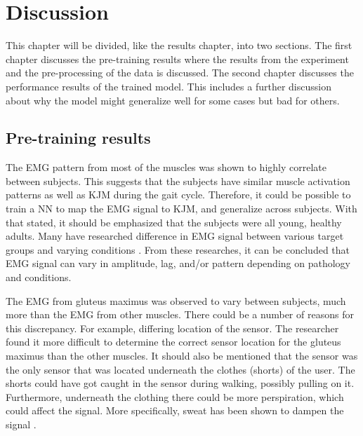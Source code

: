 \documentclass[../main.tex]{subfiles}
\begin{document}
\chapter{Discussion}
\label{sec:discussion}
This chapter will be divided, like the results chapter, into two sections. 
The first chapter discusses the pre-training results where the results from the experiment and the pre-processing of the data is discussed.
The second chapter discusses the performance results of the trained model.
This includes a further discussion about why the model might generalize well for some cases but bad for others.

\section{Pre-training results}
\label{sec:discussion_pre-training-results}
The \ac{EMG} pattern from most of the muscles was shown to highly correlate between subjects.
This suggests that the subjects have similar muscle activation patterns as well as \ac{KJM} during the gait cycle.
Therefore, it could be possible to train a \ac{NN} to map the \ac{EMG} signal to \ac{KJM}, and generalize across subjects. 
With that stated, it should be emphasized that the subjects were all young, healthy adults.
Many have researched difference in \ac{EMG} signal between various target groups and varying conditions \cite{Courtine2003,Rezgui2013,Sacco2010, Zwaan2012}.
From these researches, it can be concluded that \ac{EMG} signal can vary in amplitude, lag, and/or pattern depending on pathology and conditions.

The \ac{EMG} from gluteus maximus was observed to vary between subjects, much more than the \ac{EMG} from other muscles.
There could be a number of reasons for this discrepancy.
For example, differing location of the sensor.
The researcher found it more difficult to determine the correct sensor location for the gluteus maximus than the other muscles.
It should also be mentioned that the sensor was the only sensor that was located underneath the clothes (shorts) of the user.
The shorts could have got caught in the sensor during walking, possibly pulling on it.
Furthermore, underneath the clothing there could be more perspiration, which could affect the signal.
More specifically, sweat has been shown to dampen the signal \cite{Abdoli-Eramaki2012}.
\end{document}

